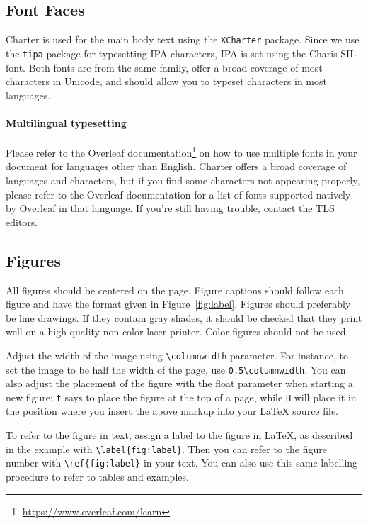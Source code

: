 \documentclass[11pt]{article}
\begin{document}
\subsection{Font Faces}

Charter is used for the main body text using the \texttt{XCharter} package. Since we use the \texttt{tipa} package for typesetting IPA characters, IPA is set using the Charis SIL font. Both fonts are from the same family, offer a broad coverage of most characters in Unicode, and should allow you to typeset characters in most languages.

\paragraph{Multilingual typesetting} Please refer to the Overleaf documentation\footnote{\url{https://www.overleaf.com/learn}} on how to use multiple fonts in your document for languages other than English. Charter offers a broad coverage of languages and characters, but if you find some characters not appearing properly, please refer to the Overleaf documentation for a list of fonts supported natively by Overleaf in that language. If you're still having trouble, contact the TLS editors.

\subsection{Figures}

All figures should be centered on the page. Figure captions should follow each figure and have the format given in Figure~\ref{fig:label}.
Figures should preferably be line drawings. If they contain gray shades, it should be checked that they print well on a high-quality non-color laser printer. Color figures should not be used.

Adjust the width of the image using \verb|\columnwidth| parameter. For instance, to set the image to be half the width of the page, use \verb|0.5\columnwidth|. You can also adjust the placement of the figure with the float parameter when starting a new figure: \verb|t| says to place the figure at the top of a page, while \verb|H| will place it in the position where you insert the above markup into your \LaTeX{} source file.

To refer to the figure in text, assign a label to the figure in \LaTeX{}, as described in the example with \verb|\label{fig:label}|. Then you can refer to the figure number with \verb|\ref{fig:label}| in your text. You can also use this same labelling procedure to refer to tables and examples.
\end{document}
